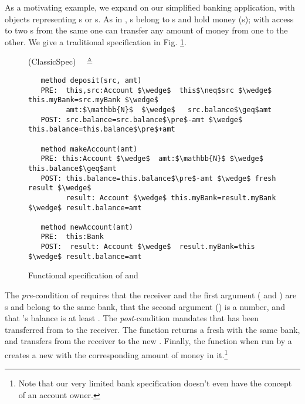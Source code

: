 

As a motivating example, we expand on our simplified banking application,
with objects representing s or s. 
As in \cite{ELang},   s belong to s and hold money (s);  
with access  to two s from the same   one can  transfer any amount of money from
 one to the other.  We give a traditional specification in Fig. \ref{fig:BankSpec}.

\begin{figure}[htbp] 
\begin{flushleft}
\hspace{0.2in}(ClassicSpec)\ \   $\triangleq$
\end{flushleft}
\begin{lstlisting}
   method deposit(src, amt)
   PRE:  this,src:Account $\wedge$  this$\neq$src $\wedge$ this.myBank=src.myBank $\wedge$ 
         amt:$\mathbb{N}$  $\wedge$   src.balance$\geq$amt
   POST: src.balance=src.balance$\pre$-amt $\wedge$ this.balance=this.balance$\pre$+amt

   method makeAccount(amt)
   PRE: this:Account $\wedge$  amt:$\mathbb{N}$ $\wedge$  this.balance$\geq$amt
   POST: this.balance=this.balance$\pre$-amt $\wedge$ fresh result $\wedge$ 
         result: Account $\wedge$ this.myBank=result.myBank $\wedge$ result.balance=amt

   method newAccount(amt)
   PRE:  this:Bank  
   POST:  result: Account $\wedge$  result.myBank=this $\wedge$ result.balance=amt
 \end{lstlisting}
 \vspace{-.8cm}
\caption{Functional specification of  and 
\vspace{-.2in}
%
}
\label{fig:functionalSpecBankAccount}
\label{fig:BankSpec}
\end{figure} 

The \textit{pre}-condition of  requires that  the receiver and the
first argument  ( and ) are s
and belong to the same bank,
that the second argument () is a number, and that 's
balance is at least .
The \textit{post}-condition mandates that  has been transferred from  to the receiver.
 The function  returns a fresh  with the same bank, and transfers 
 from the receiver  to the new .
 Finally, the function  when run by a  creates a new  with the corresponding 
 amount of money in it.\footnote{{Note that our very limited bank specification doesn't even have the concept of an account owner.}} 

